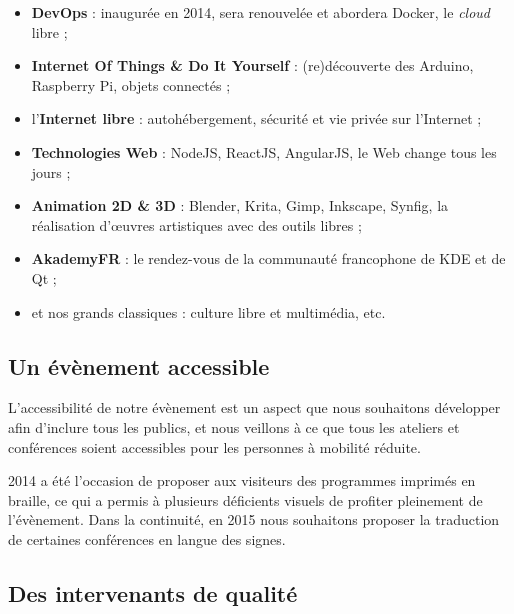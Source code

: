 \begin{itemize}[label=$\bullet$]
\item \textbf{DevOps} : inaugurée en 2014, sera renouvelée et abordera Docker, le \textit{cloud} libre ;
\item \textbf{Internet Of Things \& Do It Yourself} : (re)découverte des Arduino, Raspberry Pi, objets connectés ;
\item l’\textbf{Internet libre} : autohébergement, sécurité et vie privée sur l’Internet ;
\item \textbf{Technologies Web} : NodeJS, ReactJS, AngularJS, le Web change tous les jours ;
\item \textbf{Animation 2D \& 3D} : Blender, Krita, Gimp, Inkscape, Synfig, la réalisation d'œuvres artistiques avec des outils libres ;

\item \textbf{AkademyFR} : le rendez-vous de la communauté francophone de KDE et de Qt ;
\item et nos grands classiques : culture libre et multimédia, etc.
\end{itemize}

\subsection{Un évènement accessible}

\begin{minipage}{0.4\textwidth}
\begin{center}
\end{center}
\end{minipage}
\begin{minipage}{0.6\textwidth}
L'accessibilité de notre évènement est un aspect que nous souhaitons
 développer afin d'inclure tous les publics, et nous veillons à ce que
 tous les ateliers et conférences soient accessibles pour les personnes
 à mobilité réduite.

2014 a été l'occasion de proposer aux visiteurs des programmes
 imprimés en braille, ce qui a permis à plusieurs déficients visuels
 de profiter pleinement de l'évènement. Dans la continuité, en 2015
 nous souhaitons proposer la traduction de certaines conférences en
 langue des signes.
\end{minipage}

\subsection{Des intervenants de qualité}

